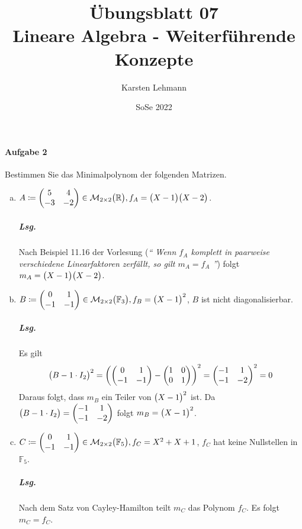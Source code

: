 \documentclass{scrreprt}
\author{Karsten Lehmann}
\date{SoSe 2022}
\title{Übungsblatt 07\\Lineare Algebra - Weiterführende Konzepte}
\begin{document}
\paragraph{Aufgabe 2} Bestimmen Sie das Minimalpolynom der folgenden Matrizen.
\begin{enumerate}[(a)]
\item $A \coloneqq \begin{pmatrix}
    5 & 4 \\
    -3 & -2 \\
  \end{pmatrix} \in \mathcal{M}_{2 \times 2}\qty\big(\mathbb{R}),
  f_A = \qty\big(X - 1)\qty\big(X - 2)$.

  \subparagraph{Lsg.} Nach Beispiel 11.16 der Vorlesung (\emph{``
    Wenn $f_A$ komplett in paarweise verschiedene Linearfaktoren zerfällt, so
    gilt $m_A = f_A$
  ''}) folgt $m_A = \qty\big(X - 1)\qty\big(X - 2)$.

\item $B \coloneqq \begin{pmatrix}
    0 & 1 \\
    -1 & -1 \\
  \end{pmatrix} \in \mathcal{M}_{2 \times 2}\qty\big(\mathbb{F}_3),
  f_B = \qty\big(X - 1)^2$, $B$ ist nicht diagonalisierbar.

  \subparagraph{Lsg.} Es gilt
  \[
    \qty\big(B - 1 \cdot I_2)^2 =
    \qty(\begin{pmatrix}
      0 & 1 \\
      -1 & -1 \\
    \end{pmatrix} - \begin{pmatrix}
      1 & 0 \\
      0 & 1 \\
    \end{pmatrix})^2
    = \begin{pmatrix}
      -1 & 1 \\
      -1 & -2 \\
    \end{pmatrix}^2
    = 0
  \]
  Daraus folgt, dass $m_B$ ein Teiler von $\qty\big(X - 1)^2$ ist.
  Da $\qty\big(B - 1 \cdot I_2) = \begin{pmatrix}
    -1 & 1 \\
    -1 & -2 \\
  \end{pmatrix}$ folgt $m_B = \qty\big(X - 1)^2$.

\item $C \coloneqq \begin{pmatrix}
    0 & 1 \\
    -1 & -1 \\
  \end{pmatrix} \in \mathcal{M}_{2 \times 2}\qty\big(\mathbb{F}_5),
  f_C = X^2 + X + 1$, $f_C$ hat keine Nullstellen in $\mathbb{F}_5$.

  \subparagraph{Lsg.} Nach dem Satz von Cayley-Hamilton teilt
  $m_C$ das Polynom $f_C$.
  Es folgt $m_C = f_C$.
\end{enumerate}
\end{document}
